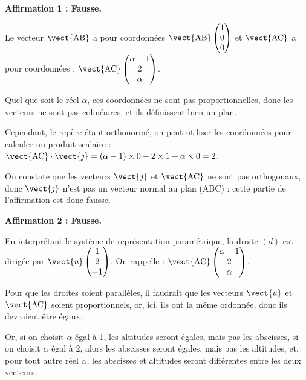 \medskip

\textbf{Affirmation 1 : Fausse.}

Le vecteur $ \vect{\mathrm{AB}} $ a pour coordonnées $ \vect{\mathrm{AB}}\begin{pmatrix} 1 \\ 0 \\ 0\end{pmatrix} $ et $ \vect{\mathrm{AC}} $ a pour coordonnées : $ \vect{\mathrm{AC}}\begin{pmatrix} \alpha - 1 \\2\\\alpha \end{pmatrix} $.

Quel que soit le réel $\alpha$, ces coordonnées ne sont pas proportionnelles, donc les vecteurs ne sont pas colinéaires, et ils définissent bien un plan.

Cependant, le repère étant orthonormé, on peut utiliser les coordonnées pour calculer un produit scalaire : \quad
$ \vect{\mathrm{AC}}\cdot\vect{\jmath} = (\alpha-1)\times 0 + 2 \times 1 + \alpha \times 0 = 2$.

On constate que les vecteurs $ \vect{\jmath} $ et $ \vect{\mathrm{AC}} $ ne sont pas orthogonaux, donc $ \vect{\jmath} $ n'est pas un vecteur normal au plan (ABC) : cette partie de l'affirmation est donc fausse.

\medskip

\textbf{Affirmation 2 : Fausse.}

En interprétant le système de représentation paramétrique, la droite $(d)$ est dirigée par $\vect{u} \begin{pmatrix}1 \\ 2  \\ -1 \end{pmatrix}$. On rappelle : $ \vect{\mathrm{AC}}\begin{pmatrix} \alpha - 1 \\2\\\alpha \end{pmatrix} $.

Pour que les droites soient parallèles, il faudrait que les vecteurs $ \vect{u} $ et $ \vect{\mathrm{AC}} $ soient proportionnels, or, ici, ils ont la même ordonnée, donc ils devraient être égaux.

Or, si on choisit $\alpha$ égal à 1, les altitudes seront égales, mais pas les abscisses, si on choisit $\alpha$ égal à 2, alors les abscisses seront égales, mais pas les altitudes, et, pour tout autre réel $\alpha$, les abscisses et altitudes seront différentes entre les deux vecteurs.

